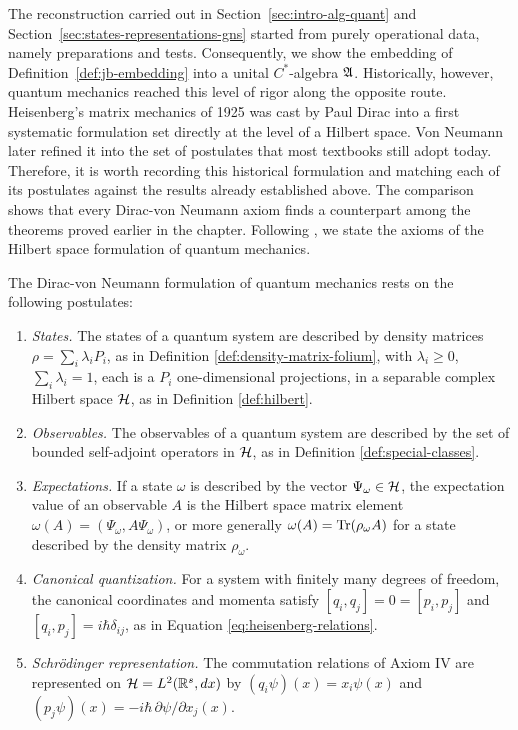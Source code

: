 	The reconstruction carried out in Section~\ref{sec:intro-alg-quant} and Section~\ref{sec:states-representations-gns} started from purely operational data, namely preparations and tests. Consequently, we show the embedding of Definition~\ref{def:jb-embedding} into a unital $C^*$-algebra $\mathfrak{A}$. Historically, however, quantum mechanics reached this level of rigor along the opposite route. Heisenberg's matrix mechanics of 1925 was cast by Paul Dirac into a first systematic formulation set directly at the level of a Hilbert space. Von Neumann later refined it into the set of postulates that most textbooks still adopt today. Therefore, it is worth recording this historical formulation and matching each of its postulates against the results already established above. The comparison shows that every Dirac-von Neumann axiom finds a counterpart among the theorems proved earlier in the chapter. Following \cite[Sect.~3.6]{strocchiIntroductionMathematicalStructure2005}, we state the axioms of the Hilbert space formulation of quantum mechanics.
	
	\begin{definition}
		\label{def:concl-dvn-axioms}
		The Dirac-von Neumann formulation of quantum mechanics rests on the following postulates:
		\begin{enumerate}
			\item[I.] \emph{States.} The states of a quantum system are described by density matrices $\rho=\sum_i\lambda_i P_i$, as in Definition \ref{def:density-matrix-folium}, with $\lambda_i\ge0$, $\sum_i\lambda_i=1$, each is a $P_i$ one-dimensional projections, in a separable complex Hilbert space $\H$, as in Definition \ref{def:hilbert}.
			\item[II.] \emph{Observables.} The observables of a quantum system are described by the set of bounded self-adjoint operators in $\H$, as in Definition \ref{def:special-classes}.
			\item[III.] \emph{Expectations.} If a state $\omega$ is described by the vector $\Psi_\omega\in\H$, the expectation value of an observable $A$ is the Hilbert space matrix element $\omega(A)=(\Psi_\omega,A\Psi_\omega)$, or more generally $\omega(A)=\Tr(\rho_\omega A)$ for a state described by the density matrix $\rho_\omega$.
			\item[IV.] \emph{Canonical quantization.} For a system with finitely many degrees of freedom, the canonical coordinates and momenta satisfy $[q_i,q_j]=0=[p_i,p_j]$ and $[q_i,p_j]=i\hbar\delta_{ij}$, as in Equation \eqref{eq:heisenberg-relations}.
			\item[V.] \emph{Schr\"odinger representation.} The commutation relations of Axiom IV are represented on $\H=L^2(\R^s,dx)$ by $(q_i\psi)(x)=x_i\psi(x)$ and $(p_j\psi)(x)=-i\hbar\,\partial\psi/\partial x_j(x)$.
		\end{enumerate}
	\end{definition}
	
